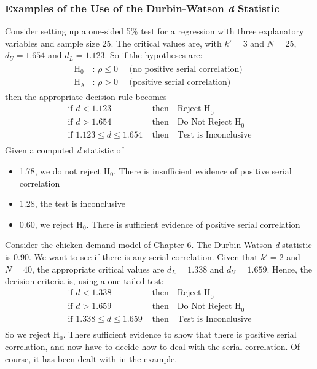 \documentclass[11pt]{article}
\begin{document}
\subsubsection{Examples of the Use of the Durbin-Watson \textit{d} Statistic}
Consider setting up a one-sided 5\% test for a regression with three explanatory variables and sample size 25. The critical values are, with $k'=3$ and $N=25$, $d_U = 1.654$ and $d_L = 1.123$. So if the hypotheses are:
\begin{align}
\label{eg9_14}
\begin{split}
\text{H}_0 & \text{: }\rho \leq 0 \quad\text{ (no positive serial correlation) }\\ 
\text{H}_\text{A} & \text{: } \rho > 0 \quad\text{ (positive serial correlation) }
\end{split}
\end{align}
then the appropriate decision rule becomes
\begin{align*}
\text{if } d<1.123 &\text{ then} \quad \text{Reject H}_0\\
\text{if } d>1.654 &\text{ then} \quad \text{Do Not Reject H}_0\\
\text{if } 1.123\leq d \leq 1.654 &\text{ then} \quad \text{Test is Inconclusive}\\
\end{align*}
Given a computed \textit{d} statistic of 
\begin{itemize}
\item 1.78, we do not reject H$_0$. There is insufficient evidence of positive serial correlation
\item 1.28, the test is inconclusive
\item 0.60, we reject H$_0$. There is sufficient evidence of positive serial correlation
\end{itemize}
Consider the chicken demand model of Chapter 6. The Durbin-Watson \textit{d} statistic is 0.90. We want to see if there is any serial correlation. Given that $k'=2$ and $N=40$, the appropriate critical values are $d_L=1.338$ and $d_U=1.659$. Hence, the decision criteria is, using a one-tailed test:
\begin{align*}
\text{if } d<1.338 &\text{ then} \quad \text{Reject H}_0\\
\text{if } d>1.659 &\text{ then} \quad \text{Do Not Reject H}_0\\
\text{if } 1.338\leq d \leq 1.659 &\text{ then} \quad \text{Test is Inconclusive}\\
\end{align*}
So we reject H$_0$. There sufficient evidence to show that there is positive serial correlation, and now have to decide how to deal with the serial correlation. Of course, it has been dealt with in the example.
\end{document}
